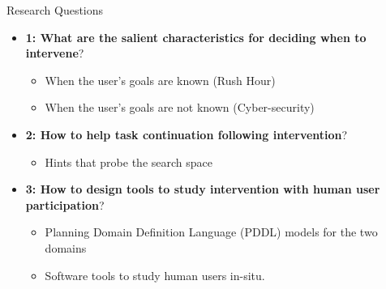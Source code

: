 \begin{frame}{Research Questions}
\begin{itemize}
\item \textbf{1: What are the salient characteristics for deciding when to intervene}?
\begin{itemize}
\item When the user’s goals are known (Rush Hour)
\item When the user's goals are not known (Cyber-security)
\end{itemize}
\item \textbf{2: How to help task continuation following intervention}?
\begin{itemize}
\item Hints that probe the search space
\end{itemize}

\item \textbf{3: How to design tools to study intervention with human user participation}?
\begin{itemize}
\item Planning Domain Definition Language (PDDL) models for the two domains
\item Software tools to study human users in-situ.
\end{itemize}
\end{itemize}
\end{frame}